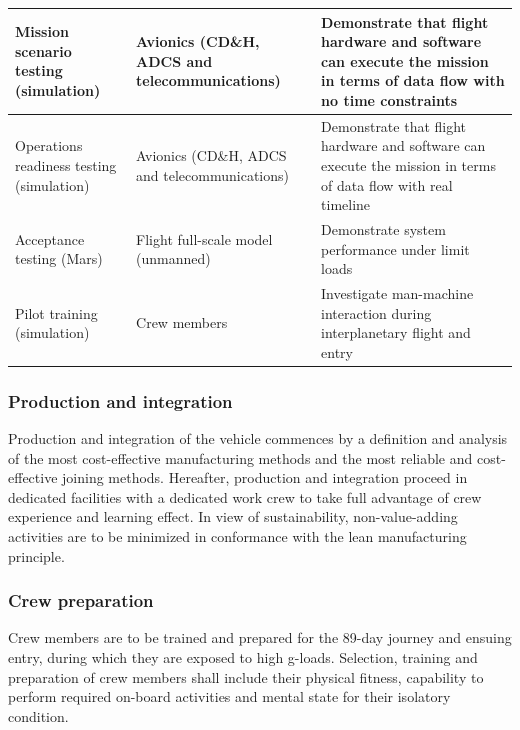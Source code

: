 \begin{table}[ht]
\begin{tabular}{|p{}|p{}|p{}|}
Mission scenario testing (simulation)        & Avionics (CD\&H, ADCS and telecommunications)                                                                         & Demonstrate that flight hardware and software can execute the mission in terms of data flow with no time constraints                                                                                                              \\ \hline
Operations readiness testing (simulation)    & Avionics (CD\&H, ADCS and telecommunications)                                                                           & Demonstrate that flight hardware and software can execute the mission in terms of data flow with real timeline                                                                                                                    \\ \hline
Acceptance testing (Mars)                    & Flight full-scale model (unmanned)                                                                                      & Demonstrate system performance under limit loads                                                                                                                                                                                  \\ \hline
Pilot training (simulation) & Crew members & Investigate man-machine interaction during interplanetary flight and entry \\ \hline
\end{tabular}
\end{table}

\subsubsection{Production and integration}
Production and integration of the vehicle commences by a definition and analysis of the most cost-effective manufacturing methods and the most reliable and cost-effective joining methods. Hereafter, production and integration proceed in dedicated facilities with a dedicated work crew to take full advantage of crew experience and learning effect. In view of sustainability, non-value-adding activities are to be minimized in conformance with the lean manufacturing principle. 

\subsubsection{Crew preparation}
Crew members are to be trained and prepared for the 89-day journey and ensuing entry, during which they are exposed to high g-loads. Selection, training and preparation of crew members shall include their physical fitness, capability to perform required on-board activities and mental state for their isolatory condition.

